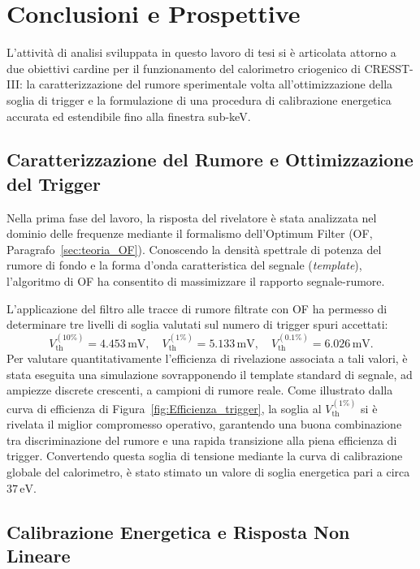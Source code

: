 \chapter{Conclusioni e Prospettive}
\label{chap:conclusioni}

L'attività di analisi sviluppata in questo lavoro di tesi si è articolata attorno a due obiettivi cardine per il funzionamento del calorimetro criogenico di CRESST-III: la caratterizzazione del rumore sperimentale volta all'ottimizzazione della soglia di trigger e la formulazione di una procedura di calibrazione energetica accurata ed estendibile fino alla finestra sub-keV.

\section*{Caratterizzazione del Rumore e Ottimizzazione del Trigger}

Nella prima fase del lavoro, la risposta del rivelatore è stata analizzata nel dominio delle frequenze mediante il formalismo dell'Optimum Filter (OF, Paragrafo~\ref{sec:teoria_OF}). Conoscendo la densità spettrale di potenza del rumore di fondo e la forma d'onda caratteristica del segnale (\textit{template}), l'algoritmo di OF ha consentito di massimizzare il rapporto segnale-rumore.

L'applicazione del filtro alle tracce di rumore filtrate con OF ha permesso di determinare tre livelli di soglia valutati sul numero di trigger spuri accettati:
\begin{equation}
    V_{\text{th}}^{(10\%)} = 4.453\,\text{mV}, \quad 
    V_{\text{th}}^{(1\%)} = 5.133\,\text{mV}, \quad 
    V_{\text{th}}^{(0.1\%)} = 6.026\,\text{mV}.
\end{equation}
Per valutare quantitativamente l'efficienza di rivelazione associata a tali valori, è stata eseguita una simulazione sovrapponendo il template standard di segnale, ad ampiezze discrete crescenti, a campioni di rumore reale. Come illustrato dalla curva di efficienza di Figura~\ref{fig:Efficienza_trigger}, la soglia al $V_{\text{th}}^{(1\%)}$ si è rivelata il miglior compromesso operativo, garantendo una buona combinazione tra discriminazione del rumore e una rapida transizione alla piena efficienza di trigger. Convertendo questa soglia di tensione mediante la curva di calibrazione globale del calorimetro, è stato stimato un valore di soglia energetica pari a circa $37\,\text{eV}$.

\section*{Calibrazione Energetica e Risposta Non Lineare}

